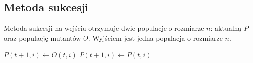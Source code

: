 \documentclass[12pt, a4paper]{article}
\begin{document}
\subsection{Metoda sukcesji}

Metoda sukcesji na wejściu otrzymuje dwie populacje o rozmiarze $n$: aktualną $P$ oraz populację mutantów $O$.
Wyjściem jest jedna populacja o rozmiarze $n$.

\begin{algorithm}[!htb]
\begin{algorithmic}[1]
      \State $P(t+1, i) \gets O(t, i)$
    \Else
      \State $P(t+1, i) \gets P(t, i)$
    \EndIf
  \EndFor
\EndFunction
\end{algorithmic}
\end{algorithm}

\nocite{*}


\end{document}

